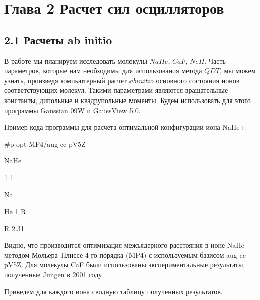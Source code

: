 \documentclass[a4paper]{article}
\begin{document}
\bigskip


\bigskip


\bigskip

\clearpage\section{Глава 2 Расчет
сил осцилляторов}
\hypertarget{RefHeading4695463868395}{}\subsection[2.1 Расчеты ab
initio]{2.1 Расчеты \foreignlanguage{english}{ab}
\foreignlanguage{english}{initio}}
\hypertarget{RefHeading4697463868395}{}
В работе мы планируем исследовать молекулы $NaHe$, $CaF$, $NeH$. 
Часть параметров, которые нам необходимы для использования метода $QDT$, мы можем узнать, произведя компьютерный расчет $ab initio$ основного состояния ионов соответствующих молекул.
Такими параметрами являются вращательные константы, дипольные и квадрупольные моменты. 
Будем использовать для этого программы \foreignlanguage{english}{Gaussian 09W} и \foreignlanguage{english}{GaussView} 5.0.

Пример кода программы для расчета оптимальной конфигурации иона
\foreignlanguage{english}{NaHe}+.

\foreignlanguage{english}{\#p opt MP4/aug-cc-pV5Z}

\foreignlanguage{english}{NaHe}

\foreignlanguage{english}{1 1}

\foreignlanguage{english}{Na \ \ \ \ \ \ \ \ \ \ \ \ }

\foreignlanguage{english}{He 1 R}

\foreignlanguage{english}{R 2.31}

Видно, что производится оптимизация межъядерного расстояния в ионе \foreignlanguage{english}{NaHe}+ методом Мольера--Плиссе 4-го порядка (\foreignlanguage{english}{MP}4) с используемым базисом aug-cc-pV5Z. 
Для молекулы \foreignlanguage{english}{CaF} были использованы экспериментальные результаты,
полученные \foreignlanguage{english}{Jungen} в 2001 году.

Приведем для каждого иона сводную таблицу полученных результатов.
\end{document}
